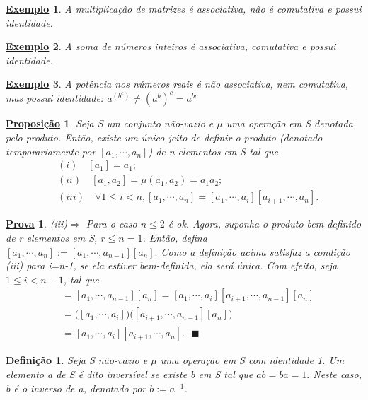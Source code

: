 \documentclass{article}
\newtheorem*{def*}{\underline{Defini\c c\~ao}}
\newtheorem*{prop*}{\underline{Proposi\c c\~ao}}
\newtheorem{example*}{\underline{Exemplo}}
\newtheorem*{proof*}{\underline{Prova}}
\renewcommand\qedsymbol{$\blacksquare$}
\begin{document}
 \begin{example*}
   A multiplica\c c\~ao de matrizes \'e associativa, n\~ao \'e comutativa e possui identidade.
 \end{example*}
\begin{example*}
  A soma de n\'umeros inteiros \'e associativa, comutativa e possui identidade.
\end{example*}
\begin{example*}
  A pot\^encia nos n\'umeros reais \'e n\~ao associativa, nem comutativa, mas possui identidade: $a^{(b^{c})} \neq (a^{b})^{c} = a^{bc}$
\end{example*}

\begin{prop*}
  Seja S um conjunto n\~ao-vazio e $\mu$ uma opera\c c\~ao em S denotada pelo produto. Ent\~ao, existe um \'unico jeito de definir o
produto (denotado temporariamente por $[a_{1}, \cdots, a_{n}]$) de n elementos em S tal que 
\begin{align*}
  &(i)\quad [a_{1}] = a_{1}; \\
  &(ii)\quad [a_{1}, a_{2}] = \mu(a_{1}, a_{2}) = a_{1}a_{2}; \\
  &(iii)\quad\forall 1\leq{i}<n, [a_{1}, \cdots, a_{n}] = [a_{1}, \cdots, a_{i}][a_{i+1}, \cdots, a_{n}].
\end{align*}
\end{prop*}
\begin{proof*}
  (iii)$\Rightarrow$ Para o caso $n\leq{2}$ \'e ok. Agora, suponha o produto bem-definido de r elementos em S, $r\leq{n=1}$. Ent\~ao,
defina $[a_{1}, \cdots, a_{n}]:= [a_{1}, \cdots, a_{n-1}][a_{n}]. $ Como a defini\c c\~ao acima satisfaz a condi\c c\~ao (iii) para
i=n-1, se ela estiver bem-definida, ela ser\'a \'unica. Com efeito, seja $1\leq{i}<n-1$, tal que 
  \begin{align*}
    [a_{1}, \cdots, a_{n}] &= [a_{1}, \cdots, a_{n-1}][a_{n}] = [a_{1}, \cdots, a_{i}][a_{i+1}, \cdots, a_{n-1}][a_{n}]\\
                           &= \biggl([a_{1}, \cdots, a_{i}]\biggr)\biggl([a_{i+1}, \cdots, a_{n-1}][a_{n}]\biggr) \\
                           &= [a_{1}, \cdots, a_{i}][a_{i+1}, \cdots, a_{n}].\text{ \qedsymbol}
  \end{align*}
\end{proof*}
\begin{def*}
  Seja S n\~ao-vazio e $\mu$ uma opera\c c\~ao em S com identidade 1. Um elemento a de S \'e dito invers\'ivel se existe b em S tal que
 $ab = ba = 1.$ Neste caso, b \'e o inverso de a, denotado por $b:=a^{-1}$.
\end{def*}
\end{document}
